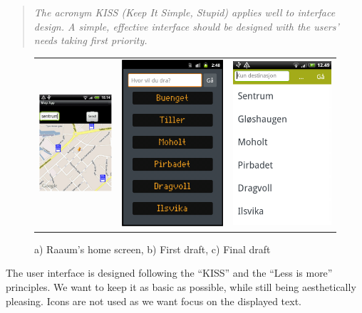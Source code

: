 \begin{quotation}
\emph{
The acronym KISS (Keep It Simple, Stupid) applies well to interface design. A simple, effective interface should be designed with the users' needs taking first priority.} \cite{guikisses}
\end{quotation}
\vspace{10 pt}
\begin{figure}
\begin{tabular}{ccc}
\includegraphics[width=0.25\linewidth]{DesigningGUI/magnus1.png} & 
\includegraphics[width=0.25\linewidth]{DesigningGUI/earlydraft.png}&
\includegraphics[width=0.25\linewidth]{DesigningGUI/finaldraft.png}
\end{tabular}
\caption{a) Raaum's home screen, b) First draft, c) Final draft}
\end{figure}
The user interface is designed following the ``KISS'' and the ``Less is more'' principles. We want to keep it as basic as possible, while still being aesthetically pleasing. Icons are not used as we want focus on the displayed text.

